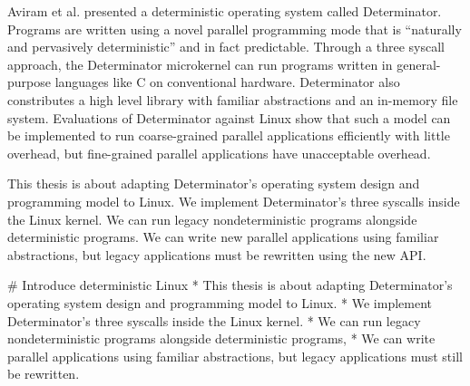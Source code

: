 \fi

Aviram et al. presented a deterministic operating system called Determinator.
Programs are written using a novel parallel programming mode that is ``naturally
and pervasively deterministic'' and in fact predictable. Through a three
syscall approach, the
Determinator microkernel can run programs written in general-purpose languages
like C on conventional hardware. Determinator also constributes a high level
library with familiar abstractions and an in-memory file system. Evaluations
of Determinator against Linux show that such a model can be implemented to run
coarse-grained parallel applications efficiently with little overhead, but
fine-grained parallel applications have unacceptable overhead.

\iffalse

# Determinator
* Aviram et al. presented a deterministic operating system called Determinator.
* Programs are written using a novel parallel programming model that is
  "naturally and pervasively deterministic" and in fact is predictable.
* Through a three syscall approach, the Determinator microkernel can run
  programs written in general-purpose languages like C on conventional hardware.
* Determinator also contributed a high level library with familiar abstractions
  and an in-memory file system.
* Evaluations of Determinator against Linux show that such a model can be
  implemented to run coarse-grained parallel application efficiently with little
  overhead, but fine-grained parallel applications have unacceptable overhead.

[MW: above bullets are good. they're your prose, not Aviram et al.'s,
right?]

\fi

This thesis is about adapting Determinator's operating system design and
programming model to Linux. We implement Determinator's three syscalls inside
the Linux kernel. We can run legacy nondeterministic programs alongside
deterministic programs. We can write new parallel applications using
familiar abstractions, but legacy applications must be rewritten using the new
API.

\iffalse

# Introduce deterministic Linux
* This thesis is about adapting Determinator's operating system design and
  programming model to Linux.
* We implement Determinator's three syscalls inside the Linux kernel.
* We can run legacy nondeterministic programs alongside deterministic programs,
* We can write parallel applications using familiar abstractions, but legacy
  applications must still be rewritten.

